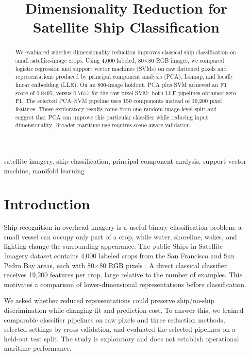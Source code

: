 \documentclass[conference]{IEEEtran}
\begin{document}
\title{Dimensionality Reduction for Satellite Ship Classification}
\author{}
\maketitle
\begin{abstract}
We evaluated whether dimensionality reduction improves classical ship classification on small satellite-image crops. Using 4,000 labeled, 80$\times$80 RGB images, we compared logistic regression and support vector machines (SVMs) on raw flattened pixels and representations produced by principal component analysis (PCA), Isomap, and locally linear embedding (LLE). On an 800-image holdout, PCA plus SVM achieved an F1 score of 0.8495, versus 0.7677 for the raw-pixel SVM; both LLE pipelines obtained zero F1. The selected PCA--SVM pipeline uses 150 components instead of 19,200 pixel features. These exploratory results come from one random image-level split and suggest that PCA can improve this particular classifier while reducing input dimensionality. Broader maritime use requires scene-aware validation.
\end{abstract}
\begin{IEEEkeywords}
satellite imagery, ship classification, principal component analysis, support vector machine, manifold learning
\end{IEEEkeywords}

\section{Introduction}
Ship recognition in overhead imagery is a useful binary classification problem: a small vessel can occupy only part of a crop, while water, shoreline, wakes, and lighting change the surrounding appearance. The public Ships in Satellite Imagery dataset contains 4,000 labeled crops from the San Francisco and San Pedro Bay areas, each with 80$\times$80 RGB pixels \cite{dataset}. A direct classical classifier receives 19,200 features per crop, large relative to the number of examples. This motivates a comparison of lower-dimensional representations before classification.

We asked whether reduced representations could preserve ship/no-ship discrimination while changing fit and prediction cost. To answer this, we trained comparable classifier pipelines on raw pixels and three reduction methods, selected settings by cross-validation, and evaluated the selected pipelines on a held-out test split. The study is exploratory and does not establish operational maritime performance.
\end{document}
